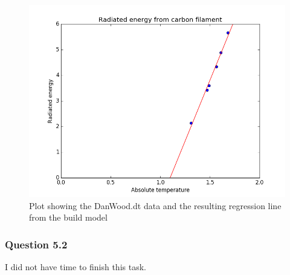 \documentclass{article}
\begin{document}
\begin{figure}[h]
  \centering
\includegraphics[scale=0.5]{figure_3}
\caption{Plot showing the DanWood.dt data and the resulting regression line from
  the build model}
\label{fig:figure3}
\end{figure}

\subsubsection*{Question 5.2}
I did not have time to finish this task.


\printbibliography
\end{document}
